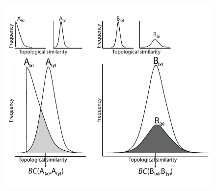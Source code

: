 \documentclass[12pt,letterpaper]{article}
\begin{document}
\newpage
\begin{figure}[!htbp]
\centering
    \includegraphics[width=1\textwidth]{Figures/In_main/Bhattacharyya_Coefficients2.pdf}
\caption{ }
\end{figure}
\end{document}
